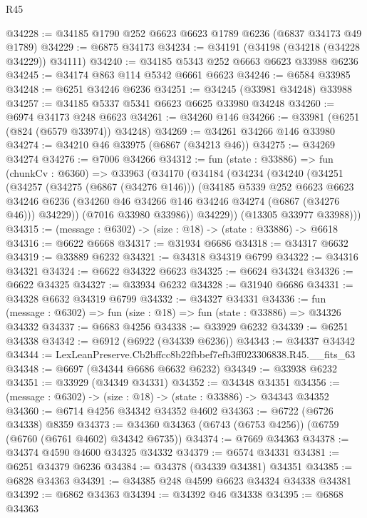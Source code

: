\begin{lexlean}{R45}
\begin{coremodule}
{@34228 := @34185 @1790 @252 @6623 @6623 @1789 @6236 (@6837 @34173 @49 @1789)
@34229 := @6875 @34173
@34234 := @34191 (@34198 (@34218 (@34228 @34229)) @34111)
@34240 := @34185 @5343 @252 @6663 @6623 @33988 @6236
@34245 := @34174 @863 @114 @5342 @6661 @6623
@34246 := @6584 @33985
@34248 := @6251 @34246 @6236
@34251 := @34245 (@33981 @34248) @33988
@34257 := @34185 @5337 @5341 @6623 @6625 @33980 @34248
@34260 := @6974 @34173 @248 @6623
@34261 := @34260 @146
@34266 := @33981 (@6251 (@824 (@6579 @33974)) @34248)
@34269 := @34261 @34266 @146 @33980
@34274 := @34210 @46 @33975 (@6867 (@34213 @46))
@34275 := @34269 @34274
@34276 := @7006 @34266
@34312 := fun (state : @33886) =>
  fun (chunkCv : @6360) =>
  @33963
    (@34170
      (@34184
        (@34234
          (@34240
            (@34251
              (@34257
                (@34275 (@6867 (@34276 @146)))
                (@34185
                  @5339
                  @252
                  @6623
                  @6623
                  @34246
                  @6236
                  (@34260 @46 @34266 @146 @34246 @34274 (@6867 (@34276 @46)))
                  @34229))
              (@7016 @33980 @33986))
            @34229))
        (@13305 @33977 @33988)))
@34315 := (message : @6302) -> (size : @18) -> (state : @33886) -> @6618
@34316 := @6622 @6668
@34317 := @31934 @6686
@34318 := @34317 @6632
@34319 := @33889 @6232
@34321 := @34318 @34319 @6799
@34322 := @34316 @34321
@34324 := @6622 @34322 @6623
@34325 := @6624 @34324
@34326 := @6622 @34325
@34327 := @33934 @6232
@34328 := @31940 @6686
@34331 := @34328 @6632 @34319 @6799
@34332 := @34327 @34331
@34336 := fun (message : @6302) => fun (size : @18) => fun (state : @33886) => @34326 @34332
@34337 := @6683 @4256
@34338 := @33929 @6232
@34339 := @6251 @34338
@34342 := @6912 (@6922 (@34339 @6236))
@34343 := @34337 @34342
@34344 := LexLeanPreserve.Cb2bffcc8b22fbbef7efb3ff023306838.R45.__fits_63
@34348 := @6697 (@34344 @6686 @6632 @6232)
@34349 := @33938 @6232
@34351 := @33929 (@34349 @34331)
@34352 := @34348 @34351
@34356 := (message : @6302) -> (size : @18) -> (state : @33886) -> @34343 @34352
@34360 := @6714 @4256 @34342 @34352 @4602
@34363 := @6722 (@6726 @34338) @8359
@34373 := @34360 @34363 (@6743 (@6753 @4256)) (@6759 (@6760 (@6761 @4602) @34342 @6735))
@34374 := @7669 @34363
@34378 := @34374 @4590 @4600 @34325 @34332
@34379 := @6574 @34331
@34381 := @6251 @34379 @6236
@34384 := @34378 (@34339 @34381) @34351
@34385 := @6828 @34363
@34391 := @34385 @248 @4599 @6623 @34324 @34338 @34381
@34392 := @6862 @34363
@34394 := @34392 @46 @34338
@34395 := @6868 @34363
}
\end{coremodule}
\end{lexlean}
